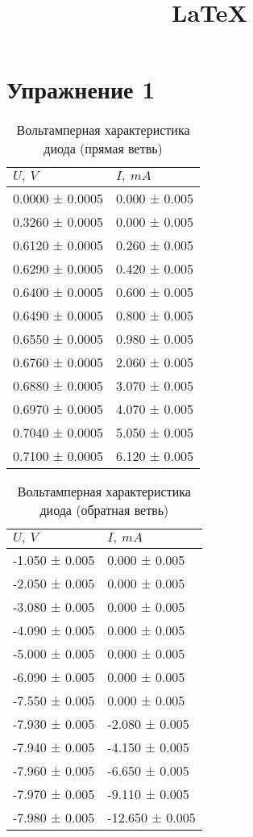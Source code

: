 \documentclass[12pt]{article}
\title{\LaTeX}
\date{}
\author{}
\begin{document}
	\section*{Упражнение 1}
	
	\indent
	
	
\begin{minipage}{0.4\textwidth}
	\begin{table}[H]
		\begin{tabular}{ll}
			\toprule
			$U,\: V$ &          $I,\: mA$ \\
			\midrule
			0.0000 ± 0.0005 &  0.000 ± 0.005 \\
			0.3260 ± 0.0005 &  0.000 ± 0.005 \\
			0.6120 ± 0.0005 &  0.260 ± 0.005 \\
			0.6290 ± 0.0005 &  0.420 ± 0.005 \\
			0.6400 ± 0.0005 &  0.600 ± 0.005 \\
			0.6490 ± 0.0005 &  0.800 ± 0.005 \\
			0.6550 ± 0.0005 &  0.980 ± 0.005 \\
			0.6760 ± 0.0005 &  2.060 ± 0.005 \\
			0.6880 ± 0.0005 &  3.070 ± 0.005 \\
			0.6970 ± 0.0005 &  4.070 ± 0.005 \\
			0.7040 ± 0.0005 &  5.050 ± 0.005 \\
			0.7100 ± 0.0005 &  6.120 ± 0.005 \\
			\bottomrule
		\end{tabular}
	\caption{Вольтамперная характеристика диода (прямая ветвь) }
	\end{table}
\end{minipage}
\hfill
\begin{minipage}{0.4\textwidth}
	\begin{table}[H]
		\begin{tabular}{ll}
			\toprule
			$U,\: V$ &          $I,\: mA$ \\
			\midrule
			-1.050 ± 0.005 &    0.000 ± 0.005 \\
			-2.050 ± 0.005 &    0.000 ± 0.005 \\
			-3.080 ± 0.005 &    0.000 ± 0.005 \\
			-4.090 ± 0.005 &    0.000 ± 0.005 \\
			-5.000 ± 0.005 &    0.000 ± 0.005 \\
			-6.090 ± 0.005 &    0.000 ± 0.005 \\
			-7.550 ± 0.005 &    0.000 ± 0.005 \\
			-7.930 ± 0.005 &   -2.080 ± 0.005 \\
			-7.940 ± 0.005 &   -4.150 ± 0.005 \\
			-7.960 ± 0.005 &   -6.650 ± 0.005 \\
			-7.970 ± 0.005 &   -9.110 ± 0.005 \\
			-7.980 ± 0.005 &  -12.650 ± 0.005 \\
			\bottomrule
		\end{tabular}
	\caption{Вольтамперная характеристика диода (обратная ветвь)}
	\end{table}
	
\end{minipage}
\end{document}
